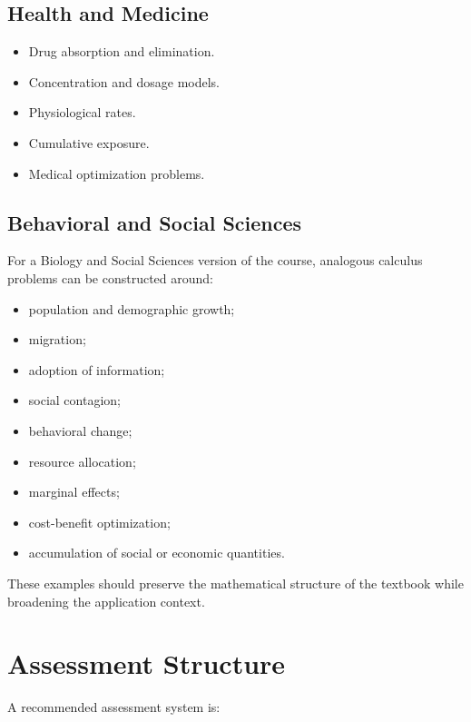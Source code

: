 \documentclass[11pt]{article}
\begin{document}
\subsection{Health and Medicine}

\begin{itemize}
    \item Drug absorption and elimination.
    \item Concentration and dosage models.
    \item Physiological rates.
    \item Cumulative exposure.
    \item Medical optimization problems.
\end{itemize}

\subsection{Behavioral and Social Sciences}

For a Biology and Social Sciences version of the course, analogous calculus
problems can be constructed around:

\begin{itemize}
    \item population and demographic growth;
    \item migration;
    \item adoption of information;
    \item social contagion;
    \item behavioral change;
    \item resource allocation;
    \item marginal effects;
    \item cost-benefit optimization;
    \item accumulation of social or economic quantities.
\end{itemize}

These examples should preserve the mathematical structure of the textbook
while broadening the application context.

\section{Assessment Structure}

A recommended assessment system is:
\end{document}
